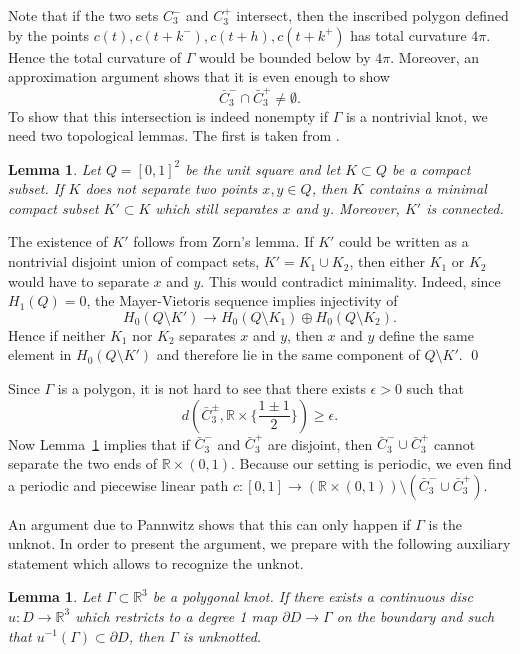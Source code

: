 \documentclass[a4paper,12pt]{amsart}
\numberwithin{equation}{section}
\def\D{\partial}
\def\R{\mathbb R}
\def\eps{\epsilon}
\def\Ga{\Gamma}
\theoremstyle{plain}
\newtheorem{lem}[thm]{Lemma}
\theoremstyle{named}
\theoremstyle{definition}
\theoremstyle{remark}
\newcommand{\blem}{\begin{lem}}
\newcommand{\elem}{\end{lem}}
\begin{document}
Note that if the two sets $C_3^-$ and $C_3^+$ intersect, then the inscribed polygon defined by the points
$c(t),c(t+k^-),c(t+h),c(t+k^+)$ has total curvature $4\pi$. Hence the total curvature of $\Ga$ would be bounded below by $4\pi$.
 Moreover, an approximation argument shows that it is even enough to show  
\begin{equation*}
\tag{$\star$}\bar C_3^-\cap\bar C_3^+\neq\emptyset.
\end{equation*}
To show that this intersection is indeed nonempty if $\Ga$ is a nontrivial knot,
we need two topological lemmas. The first is taken from \cite{LWint}. 
 

\blem\label{lem_sep}
Let $Q=[0,1]^2$ be the unit square and let $K\subset Q$ be a compact subset.
If $K$ does not separate two points $x,y\in Q$, then $K$ contains a minimal compact subset $K'\subset K$
which still separates $x$ and $y$. Moreover, $K'$ is connected.
\elem

\proof
The existence of $K'$ follows from Zorn's lemma. If $K'$
could be written as a nontrivial disjoint union of compact sets, $K'=K_1\cup K_2$,
then either $K_1$ or $K_2$ would have to separate $x$ and $y$. This would contradict minimality.
Indeed, since $H_1(Q)=0$, the Mayer-Vietoris sequence implies injectivity of
\[H_0(Q \setminus K')\to H_0(Q \setminus K_1)\oplus H_0(Q \setminus K_2).\]
Hence if neither $K_1$ nor $K_2$ separates $x$ and $y$,
then $x$ and $y$ define the same element in $H_0(Q \setminus K')$
and therefore lie in the same component of $Q \setminus K'$.
\qed

Since $\Ga$ is a polygon, it is not hard to see that there exists $\eps>0$ 
such that 
\[d(\bar C_3^\pm,\R\times \{\frac{1\pm 1}{2}\})\geq\eps.\]
Now Lemma~\ref{lem_sep} implies that if $\bar C_3^-$ and $\bar C_3^+$
are disjoint, then $\bar C_3^-\cup\bar C_3^+$ cannot separate the two ends of $\R\times(0,1)$.
Because our setting is periodic, we even find a periodic and piecewise linear path $c:[0,1]\to(\R\times(0,1))\setminus (\bar C_3^-\cup\bar C_3^+)$.

An argument due to Pannwitz shows that this can only happen if $\Ga$ is the unknot.
In order to present the argument, we prepare with the following auxiliary statement which allows to recognize the unknot.

\blem\label{lem_unknot}
Let $\Ga\subset \R^3$ be a polygonal knot. If there exists a continuous disc $u:D\to\R^3$
which restricts to a degree 1 map $\D D\to\Ga$ on the boundary and such that $u^{-1}(\Ga)\subset\D D$,
then $\Ga$ is unknotted.
\elem
\end{document}

